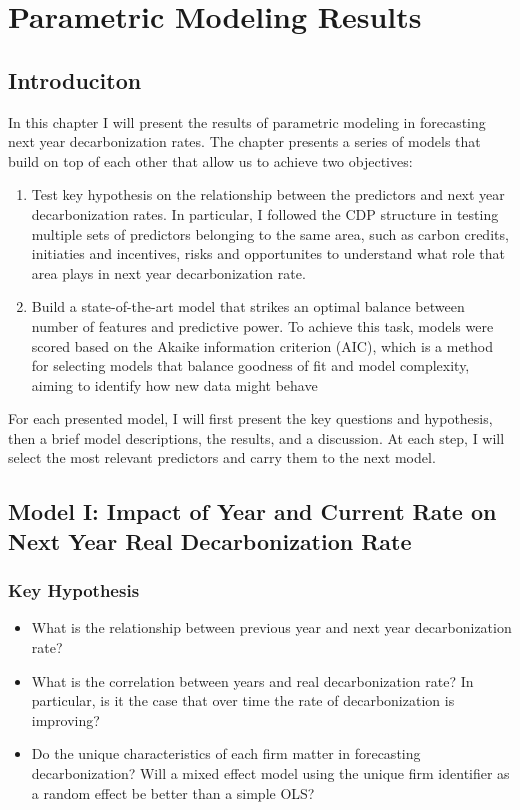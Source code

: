 \chapter{Parametric Modeling Results}

\section{Introduciton}
In this chapter I will present the results of parametric modeling in forecasting next year decarbonization rates. The chapter presents a series of models that build on top of each other that allow us to achieve two objectives:
\begin{enumerate}
    \item Test key hypothesis on the relationship between the predictors and next year decarbonization rates. In particular, I followed the CDP structure in testing multiple sets of predictors belonging to the same area, such as carbon credits, initiaties and incentives, risks and opportunites to understand what role that area plays in next year decarbonization rate. 
    \item Build a state-of-the-art model that strikes an optimal balance between number of features and predictive power. To achieve this task, models were scored based on the Akaike information criterion (AIC), which is a method for selecting models that balance goodness of fit and model complexity, aiming to identify how new data might behave \cite{AIC}
\end{enumerate}
For each presented model, I will first present the key questions and hypothesis, then a brief model descriptions, the results, and a discussion. At each step, I will select the most relevant predictors and carry them to the next model. 

\section{Model I: Impact of Year and Current Rate on Next Year Real Decarbonization Rate}

\subsection{Key Hypothesis}
\begin{itemize}
    \item What is the relationship between previous year and next year decarbonization rate?
    \item What is the correlation between years and real decarbonization rate? In particular, is it the case that over time the rate of decarbonization is improving? 
    \item Do the unique characteristics of each firm matter in forecasting decarbonization? Will a mixed effect model using the unique firm identifier as a random effect be better than a simple OLS?
\end{itemize}

